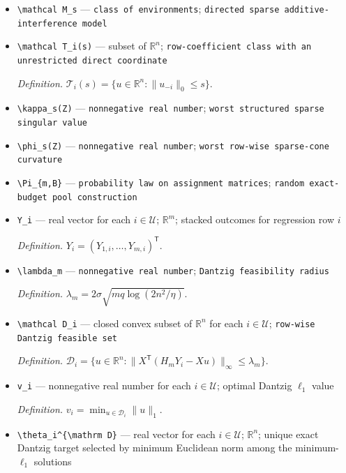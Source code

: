 \documentclass{article}
\begin{document}
\begin{itemize}
  \item \texttt{\textbackslash{}\allowbreak{}mathcal M\_\allowbreak{}s} --- \texttt{class of environments}; \texttt{directed sparse additive-\allowbreak{}interference model}
  \item \texttt{\textbackslash{}\allowbreak{}mathcal T\_\allowbreak{}i(s)} --- subset of \(\mathbb R^n\); \texttt{row-\allowbreak{}coefficient class with an unrestricted direct coordinate}
  \par\smallskip\noindent\emph{Definition.} \(\mathcal T_i(s)=\{u\in\mathbb R^n:\lVert u_{-i}\rVert_0\le s\}\).
  \item \texttt{\textbackslash{}\allowbreak{}kappa\_\allowbreak{}s(Z)} --- \texttt{nonnegative real number}; \texttt{worst structured sparse singular value}
  \item \texttt{\textbackslash{}\allowbreak{}phi\_\allowbreak{}s(Z)} --- \texttt{nonnegative real number}; \texttt{worst row-\allowbreak{}wise sparse-\allowbreak{}cone curvature}
  \item \texttt{\textbackslash{}\allowbreak{}Pi\_\allowbreak{}\{m,\allowbreak{}B\}\allowbreak{}} --- \texttt{probability law on assignment matrices}; \texttt{random exact-\allowbreak{}budget pool construction}
  \item \texttt{Y\_\allowbreak{}i} --- real vector for each \(i\in\mathcal U\); \(\mathbb R^m\); stacked outcomes for regression row \(i\)
  \par\smallskip\noindent\emph{Definition.} \(Y_i=(Y_{1,i},\ldots,Y_{m,i})^{\mathsf T}\).
  \item \texttt{\textbackslash{}\allowbreak{}lambda\_\allowbreak{}m} --- \texttt{nonnegative real number}; \texttt{Dantzig feasibility radius}
  \par\smallskip\noindent\emph{Definition.} \(\lambda_m=2\sigma\sqrt{mq\log(2n^2/\eta)}\).
  \item \texttt{\textbackslash{}\allowbreak{}mathcal D\_\allowbreak{}i} --- closed convex subset of \(\mathbb R^n\) for each \(i\in\mathcal U\); \texttt{row-\allowbreak{}wise Dantzig feasible set}
  \par\smallskip\noindent\emph{Definition.} \(\mathcal D_i=\{u\in\mathbb R^n:\lVert X^{\mathsf T}(H_mY_i-Xu)\rVert_\infty\le\lambda_m\}\).
  \item \texttt{v\_\allowbreak{}i} --- nonnegative real number for each \(i\in\mathcal U\); optimal Dantzig \(\ell_1\) value
  \par\smallskip\noindent\emph{Definition.} \(v_i=\min_{u\in\mathcal D_i}\lVert u\rVert_1\).
  \item \texttt{\textbackslash{}\allowbreak{}theta\_\allowbreak{}i\textasciicircum{}\{\textbackslash{}\allowbreak{}mathrm D\}\allowbreak{}} --- real vector for each \(i\in\mathcal U\); \(\mathbb R^n\); unique exact Dantzig target selected by minimum Euclidean norm among the minimum-\(\ell_1\) solutions

\end{itemize}
\end{document}
